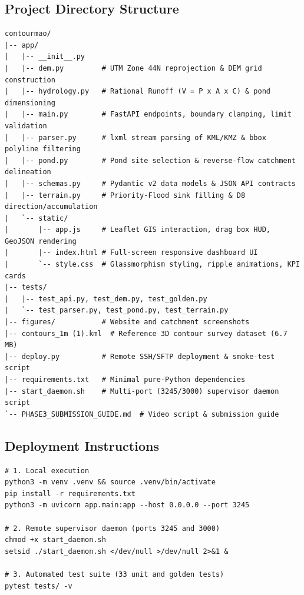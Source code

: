\documentclass[manuscript,screen,review]{acmart}
\begin{document}
\subsection{Project Directory Structure}
\begin{footnotesize}
\begin{verbatim}
contourmao/
|-- app/
|   |-- __init__.py
|   |-- dem.py         # UTM Zone 44N reprojection & DEM grid construction
|   |-- hydrology.py   # Rational Runoff (V = P x A x C) & pond dimensioning
|   |-- main.py        # FastAPI endpoints, boundary clamping, limit validation
|   |-- parser.py      # lxml stream parsing of KML/KMZ & bbox polyline filtering
|   |-- pond.py        # Pond site selection & reverse-flow catchment delineation
|   |-- schemas.py     # Pydantic v2 data models & JSON API contracts
|   |-- terrain.py     # Priority-Flood sink filling & D8 direction/accumulation
|   `-- static/
|       |-- app.js     # Leaflet GIS interaction, drag box HUD, GeoJSON rendering
|       |-- index.html # Full-screen responsive dashboard UI
|       `-- style.css  # Glassmorphism styling, ripple animations, KPI cards
|-- tests/
|   |-- test_api.py, test_dem.py, test_golden.py
|   `-- test_parser.py, test_pond.py, test_terrain.py
|-- figures/           # Website and catchment screenshots
|-- contours_1m (1).kml  # Reference 3D contour survey dataset (6.7 MB)
|-- deploy.py          # Remote SSH/SFTP deployment & smoke-test script
|-- requirements.txt   # Minimal pure-Python dependencies
|-- start_daemon.sh    # Multi-port (3245/3000) supervisor daemon script
`-- PHASE3_SUBMISSION_GUIDE.md  # Video script & submission guide
\end{verbatim}
\end{footnotesize}

\subsection{Deployment Instructions}
\begin{footnotesize}
\begin{verbatim}
# 1. Local execution
python3 -m venv .venv && source .venv/bin/activate
pip install -r requirements.txt
python3 -m uvicorn app.main:app --host 0.0.0.0 --port 3245

# 2. Remote supervisor daemon (ports 3245 and 3000)
chmod +x start_daemon.sh
setsid ./start_daemon.sh </dev/null >/dev/null 2>&1 &

# 3. Automated test suite (33 unit and golden tests)
pytest tests/ -v
\end{verbatim}
\end{footnotesize}
\end{document}
